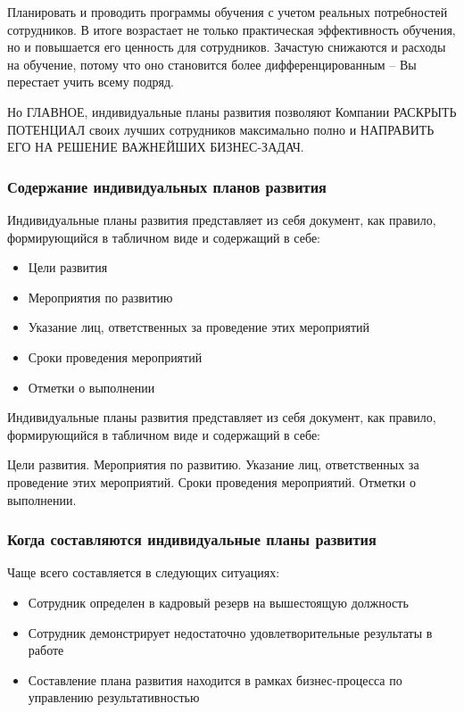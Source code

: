 \documentclass{../industrial-development}
\begin{document}
	Планировать и проводить программы обучения с учетом реальных потребностей сотрудников. В итоге возрастает не только практическая эффективность обучения, но и повышается его ценность для сотрудников. Зачастую снижаются и расходы на обучение, потому что оно становится более дифференцированным – Вы перестает учить всему подряд.


Но ГЛАВНОЕ, индивидуальные планы развития позволяют Компании РАСКРЫТЬ ПОТЕНЦИАЛ своих лучших сотрудников максимально полно и НАПРАВИТЬ ЕГО НА РЕШЕНИЕ ВАЖНЕЙШИХ БИЗНЕС-ЗАДАЧ.

\begin{frame} \frametitle{Содержание индивидуальных планов развития}
  \begin{block}{ }
Индивидуальные планы развития представляет из себя документ, как правило, формирующийся в табличном виде и содержащий в себе:

  \end{block}
  
   \begin{itemize}
  \item Цели развития
  \item Мероприятия по развитию
  \item	 Указание лиц, ответственных за проведение этих мероприятий
 \item	Сроки проведения мероприятий
 \item	Отметки о выполнении
  \end{itemize}
\end{frame}

\lecturenotes
Индивидуальные планы развития представляет из себя документ, как правило, формирующийся в табличном виде и содержащий в себе:

  Цели развития.
 Мероприятия по развитию.
  Указание лиц, ответственных за проведение этих мероприятий.
 Сроки проведения мероприятий.
Отметки о выполнении.

\begin{frame} \frametitle{Когда составляются индивидуальные планы развития }
  \begin{block}{ }
Чаще всего составляется в следующих ситуациях:

  \end{block}
  
   \begin{itemize}
   только что принят на работу
  \item Сотрудник определен в кадровый резерв на вышестоящую должность
  \item	 Сотрудник демонстрирует недостаточно удовлетворительные результаты в работе
 \item	Составление плана развития находится в рамках бизнес-процесса по управлению результативностью
  \end{itemize}
\end{frame}
\end{document}
